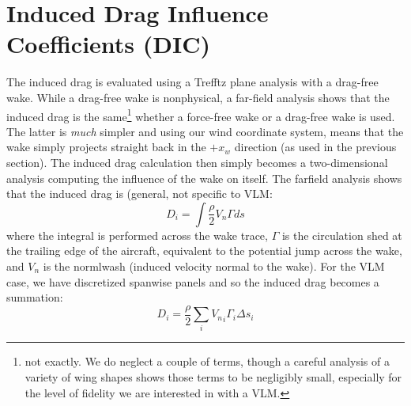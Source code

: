 \documentclass{article}
\begin{document}




\section{Induced Drag Influence Coefficients (DIC)}

The induced drag is evaluated using a Trefftz plane analysis with a drag-free wake.  While a drag-free wake is nonphysical, a far-field analysis shows that the induced drag is the same\footnote{not exactly.  We do neglect a couple of terms, though a careful analysis of a variety of wing shapes shows those terms to be negligibly small, especially for the level of fidelity we are interested in with a VLM.} whether a force-free wake or a drag-free wake is used.  The latter is \emph{much} simpler and using our wind coordinate system, means that the wake simply projects straight back in the $+x_w$ direction (as used in the previous section).  The induced drag calculation then simply becomes a two-dimensional analysis computing the influence of the wake on itself.  The farfield analysis shows that the induced drag is (general, not specific to VLM:
\begin{equation}
D_i = \int \frac{\rho}{2} V_n \Gamma ds
\end{equation}
where the integral is performed across the wake trace, $\Gamma$ is the circulation shed at the trailing edge of the aircraft, equivalent to the potential jump across the wake, and $V_n$ is the normlwash (induced velocity normal to the wake).  For the VLM case, we have discretized spanwise panels and so the induced drag becomes a summation:
\begin{equation}
D_i = \frac{\rho}{2} \sum_i  {V_n}_i \Gamma_i \Delta s_i
\label{eq:idrag}
\end{equation}
\end{document}
